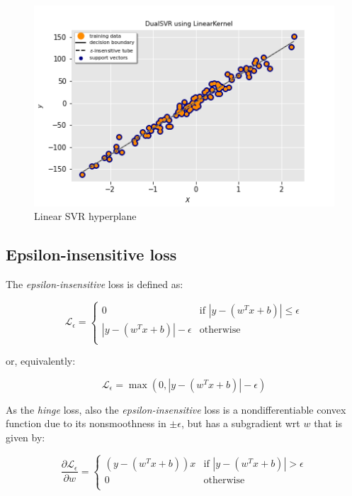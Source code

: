 \begin{figure}[h!]
	\centering
  	\includegraphics[scale=0.6]{img/linear_dual_svr_hyperplane.png}
  	\caption{Linear SVR hyperplane}
  	\label{fig:linear_dual_svr_hyperplane}
\end{figure}

\subsection{Epsilon-insensitive loss}

The \emph{epsilon-insensitive} loss is defined as:

\begin{equation} \label{eq:eps_loss1}
	\mathcal{L}_\epsilon = 
	\begin{cases}
		0 & \text{if } |y - (w^T x + b)| \leq \epsilon \\
		|y - (w^T x + b)| - \epsilon & \text{otherwise} \\
	\end{cases}
\end{equation}

or, equivalently:

\begin{equation} \label{eq:eps_loss2}
	\mathcal{L}_\epsilon = \max(0, |y - (w^T x + b)| - \epsilon)
\end{equation}

As the \emph{hinge} loss, also the \emph{epsilon-insensitive} loss is a nondifferentiable convex function due to its nonsmoothness in $\pm\epsilon$, but has a subgradient wrt $w$ that is given by:

\begin{equation} \label{eq:eps_loss_der}
	\frac{\partial \mathcal{L_\epsilon}}{\partial w}=
		\begin{cases}
            (y - (w^T x + b)) x & \text{if } |y - (w^T x + b)| > \epsilon \\
            0 & \text{otherwise} \\ 
        \end{cases}
\end{equation}

